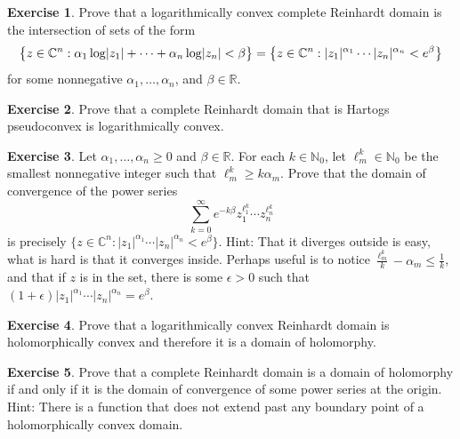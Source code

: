 \documentclass[12pt,openany]{book}
\newcommand{\avoidbreak}{\postdisplaypenalty=100}
\newcommand{\sabs}[1]{\lvert {#1} \rvert}
\newcommand{\C}{{\mathbb{C}}}
\newcommand{\R}{{\mathbb{R}}}
\newcommand{\N}{{\mathbb{N}}}
\theoremstyle{plain}
\theoremstyle{remark}
\theoremstyle{definition}
\newenvironment{exbox}{%
    \def\FrameCommand{\vrule width 1pt \relax\hspace{10pt}}%
    \MakeFramed{\advance\hsize-\width\FrameRestore}%
}{%
    \endMakeFramed
}
\theoremstyle{exercise}
\newtheorem{exercise}{Exercise}[section]
\theoremstyle{example}
\begin{document}
\begin{exbox}
\begin{exercise}
Prove that a logarithmically convex complete Reinhardt domain
is the intersection of sets of the form
\begin{equation*}
\bigl\{ z \in \C^n : \alpha_1 \log \sabs{z_1} + \cdots + \alpha_n \log
\sabs{z_n} < \beta  \bigr\}
=
\bigl\{ z \in \C^n : \sabs{z_1}^{\alpha_1} \cdots \sabs{z_n}^{\alpha_n}
< e^\beta \bigr\}
\avoidbreak
\end{equation*}
for some nonnegative $\alpha_1,\ldots,\alpha_n$, and $\beta \in \R$.
\end{exercise}

\begin{exercise}
Prove that a complete Reinhardt domain that is Hartogs
pseudoconvex is logarithmically convex.
\end{exercise}

\begin{exercise}
\pagebreak[2]
Let $\alpha_1,\ldots,\alpha_n \geq 0$ and $\beta \in \R$.
For each $k \in \N_0$, let $\ell_m^k \in \N_0$ be the smallest nonnegative integer such that
$\ell_m^k \geq k \alpha_m$.
Prove that the domain of convergence of the power series
\begin{equation*}
\sum_{k=0}^\infty e^{-k\beta}
z_1^{\ell_1^k}
\cdots
z_n^{\ell_n^k}
\end{equation*}
is precisely
$\bigl\{ z \in \C^n :
\sabs{z_1}^{\alpha_1} \cdots \sabs{z_n}^{\alpha_n}
< e^\beta \bigr\}$.
Hint: That it diverges outside is easy, what is hard is that it converges
inside.  Perhaps useful is to notice
$\frac{\ell_m^k}{k}-\alpha_m \leq \frac{1}{k}$, and
that if $z$ is in the set, there is some $\epsilon > 0$ such that
$(1+\epsilon)\sabs{z_1}^{\alpha_1} \cdots \sabs{z_n}^{\alpha_n} =
e^{\beta}$.
\end{exercise}

\begin{exercise}
Prove that a logarithmically convex Reinhardt domain is holomorphically
convex and therefore it is a domain of holomorphy.
\end{exercise}

\begin{exercise}
Prove that a complete Reinhardt domain is
a domain of holomorphy if and only if it is the
domain of convergence of some power series at the origin.  Hint: There is a
function that does not extend past any boundary point of a holomorphically
convex domain.
\end{exercise}
\end{exbox}
\end{document}
